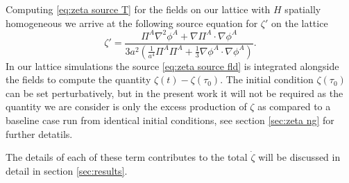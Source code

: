 Computing \eqref{eq:zeta source T} for the fields on our lattice with $H$ spatially homogeneous we arrive at the following source equation for $\zeta'$ on the lattice
\begin{equation} \label{eq:zeta source fld}
  \zeta' = \frac{\Pi^A\nabla^2\phi^A + \nabla\Pi^A\cdot\nabla\phi^A}{3a^2\left(\frac{1}{a^4}\Pi^A\Pi^A + \frac{1}{3}\nabla\phi^A\cdot\nabla\phi^A \right)}.
\end{equation}
In our lattice simulations the source \eqref{eq:zeta source fld} is integrated alongside the fields to compute the quantity $\zeta(t) - \zeta(\tau_0)$.
The initial condition $\zeta(\tau_0)$ can be set perturbatively, but in the present work it will not be required as the quantity we are consider is only the excess production of $\zeta$ as compared to a baseline case run from identical initial conditions, see section \ref{sec:zeta ng} for further detatils.

The details of each of these term contributes to the total $\dot{\zeta}$ will be discussed in detail in section \ref{sec:results}.

